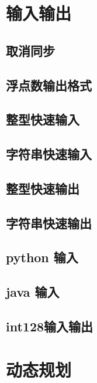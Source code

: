 \chapter{输入输出}
\section{取消同步}
\raggedbottom
\hrulefill
\section{浮点数输出格式}
\raggedbottom
\hrulefill
\section{整型快速输入}
\raggedbottom
\hrulefill
\section{字符串快速输入}
\raggedbottom
\hrulefill
\section{整型快速输出}
\raggedbottom
\hrulefill
\section{字符串快速输出}
\raggedbottom
\hrulefill
\section{python 输入}
\raggedbottom
\hrulefill
\section{java 输入}
\raggedbottom
\hrulefill
\section{int128输入输出}
\raggedbottom
\hrulefill

\chapter{动态规划}
